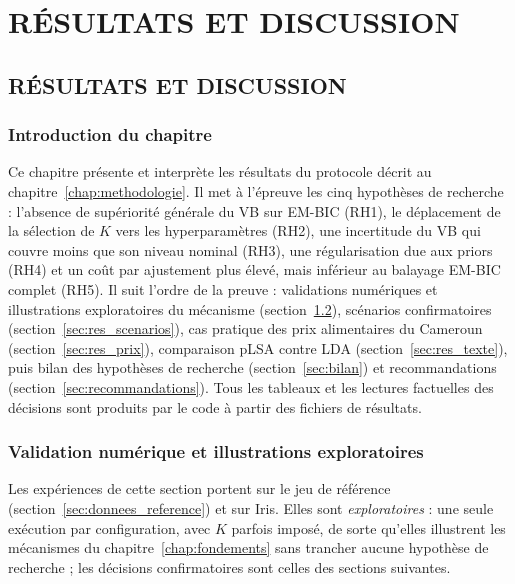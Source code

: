 \part{RÉSULTATS ET DISCUSSION}

\chapter{RÉSULTATS ET DISCUSSION}\label{chap:resultats}
\section{Introduction du chapitre}\label{sec:intro_resultats}
Ce chapitre présente et interprète les résultats du protocole décrit au chapitre~\ref{chap:methodologie}. Il met à l'épreuve les cinq hypothèses de recherche : l'absence de supériorité générale du VB sur EM-BIC (RH1), le déplacement de la sélection de $K$ vers les hyperparamètres (RH2), une incertitude du VB qui couvre moins que son niveau nominal (RH3), une régularisation due aux priors (RH4) et un coût par ajustement plus élevé, mais inférieur au balayage EM-BIC complet (RH5). Il suit l'ordre de la preuve : validations numériques et illustrations exploratoires du mécanisme (section~\ref{sec:res_illustrations}), scénarios confirmatoires (section~\ref{sec:res_scenarios}), cas pratique des prix alimentaires du Cameroun (section~\ref{sec:res_prix}), comparaison pLSA contre LDA (section~\ref{sec:res_texte}), puis bilan des hypothèses de recherche (section~\ref{sec:bilan}) et recommandations (section~\ref{sec:recommandations}). Tous les tableaux et les lectures factuelles des décisions sont produits par le code à partir des fichiers de résultats.

\section{Validation numérique et illustrations exploratoires}\label{sec:res_illustrations}
Les expériences de cette section portent sur le jeu de référence (section~\ref{sec:donnees_reference}) et sur Iris. Elles sont \emph{exploratoires} : une seule exécution par configuration, avec $K$ parfois imposé, de sorte qu'elles illustrent les mécanismes du chapitre~\ref{chap:fondements} sans trancher aucune hypothèse de recherche ; les décisions confirmatoires sont celles des sections suivantes.


